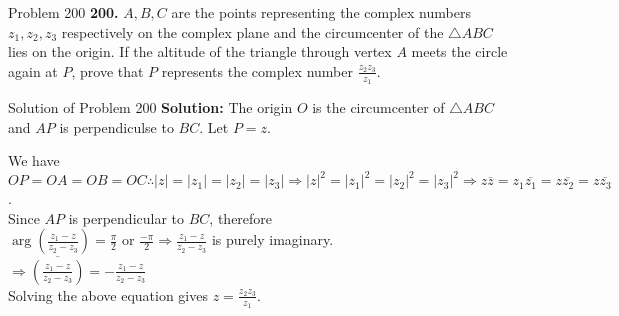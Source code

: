 \documentclass[aspectratio=169,8pt]{beamer}
\begin{document}
\begin{frame}{Problem 200}
  \textbf{200.} $A, B, C$ are the points representing the complex numbers $z_1, z_2, z_3$ respectively on the complex plane and the
  circumcenter of the $\triangle ABC$ lies on the origin. If the altitude of the triangle through vertex $A$ meets the circle again
  at $P$, prove that $P$ represents the complex number $\frac{z_2z_3}{z_1}$.
\end{frame}
\begin{frame}{Solution of Problem 200}
  \textbf{Solution:} The origin $O$ is the circumcenter of $\triangle ABC$ and $AP$ is perpendiculse to $BC$. Let $P = z$.
  \begin{center}
  \end{center}
  We have $OP=OA=OB=OC \therefore |z| = |z_1| = |z_2| = |z_3| \Rightarrow |z|^2 = |z_1|^2 = |z_2|^2 = |z_3|^2 \Rightarrow
  z\overline{z} = z_1\overline{z_1} = z\overline{z_2} = z\overline{z_3}$.\\
  \vspace*{0.2cm}
  Since $AP$ is perpendicular to $BC$, therefore\\
  \vspace*{0.2cm}
  $\arg\left(\frac{z_1 - z}{z_2 - z_3}\right) = \frac{\pi}{2}$ or $\frac{-\pi}{2}\Rightarrow \frac{z_1 - z}{z_2 - z_3}$ is purely
  imaginary.\\
  \vspace*{0.2cm}
  $\Rightarrow \overline{\left(\frac{z_1 - z}{z_2 - z_3}\right)} = -\frac{z_1 - z}{z_2 - z_3}$\\
  \vspace*{0.2cm}
  Solving the above equation gives $z = \frac{z_2z_3}{z_1}$.
\end{frame}
\end{document}
